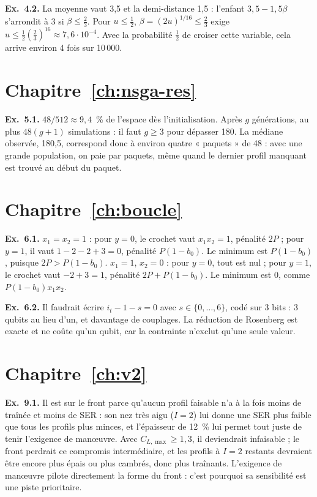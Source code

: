 \textbf{Ex.~4.2.} La moyenne vaut 3,5 et la demi-distance 1,5 : l'enfant $3{,}5-1{,}5\beta$ s'arrondit à 3 si $\beta\le\frac23$. Pour $u\le\frac12$, $\beta=(2u)^{1/16}\le\frac23$ exige $u\le\frac12(\frac23)^{16}\approx7{,}6\cdot10^{-4}$. Avec la probabilité $\frac12$ de croiser cette variable, cela arrive environ 4 fois sur 10\,000.

\section*{Chapitre~\ref{ch:nsga-res}}
\textbf{Ex.~5.1.} $48/512\approx9{,}4$~\% de l'espace dès l'initialisation. Après $g$ générations, au plus $48(g+1)$ simulations : il faut $g\ge3$ pour dépasser 180. La médiane observée, 180,5, correspond donc à environ quatre « paquets » de 48 : avec une grande population, on paie par paquets, même quand le dernier profil manquant est trouvé au début du paquet.

\section*{Chapitre~\ref{ch:boucle}}
\textbf{Ex.~6.1.} $x_1=x_2=1$ : pour $y=0$, le crochet vaut $x_1x_2=1$, pénalité $2P$ ; pour $y=1$, il vaut $1-2-2+3=0$, pénalité $P(1-b_0)$. Le minimum est $P(1-b_0)$, puisque $2P>P(1-b_0)$. $x_1=1$, $x_2=0$ : pour $y=0$, tout est nul ; pour $y=1$, le crochet vaut $-2+3=1$, pénalité $2P+P(1-b_0)$. Le minimum est 0, comme $P(1-b_0)x_1x_2$.

\textbf{Ex.~6.2.} Il faudrait écrire $i_t-1-s=0$ avec $s\in\{0,\dots,6\}$, codé sur 3 bits : 3 qubits au lieu d'un, et davantage de couplages. La réduction de Rosenberg est exacte et ne coûte qu'un qubit, car la contrainte n'exclut qu'une seule valeur.



\section*{Chapitre~\ref{ch:v2} }
\textbf{Ex.~9.1.} Il est sur le front parce qu'aucun profil faisable n'a à la fois moins de traînée et moins de SER : son nez très aigu ($I=2$) lui donne une SER plus faible que tous les profils plus minces, et l'épaisseur de 12~\% lui permet tout juste de tenir l'exigence de manœuvre. Avec $C_{L,\max}\ge1{,}3$, il deviendrait infaisable ; le front perdrait ce compromis intermédiaire, et les profils à $I=2$ restants devraient être encore plus épais ou plus cambrés, donc plus traînants. L'exigence de manœuvre pilote directement la forme du front : c'est pourquoi sa sensibilité est une piste prioritaire.

